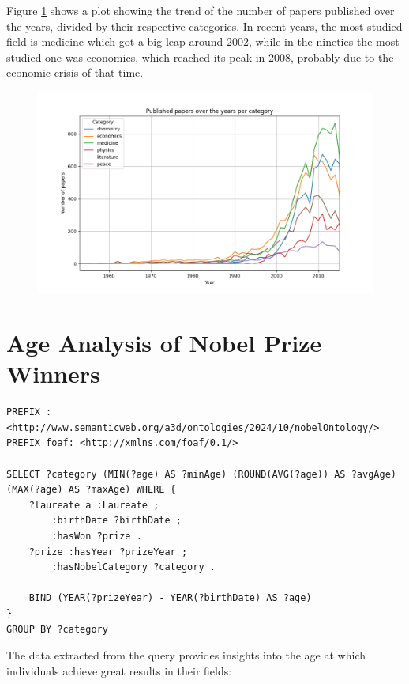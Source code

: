 \documentclass{article}
\begin{document}
\noindent Figure \ref{fig:papersPerCategory} shows a plot showing the trend of the number of papers published over the years, divided by their respective categories.
In recent years, the most studied field is medicine which got a big leap around 2002, while in the nineties the most studied one was economics, which
reached its peak in 2008, probably due to the economic crisis of that time.
\begin{figure}[ht]
	\label{fig:papersPerCategory}
	\centering
	\includegraphics[width=\textwidth]{../queries/plots/papersPerCategory.png}
\end{figure}

\newpage

\section{Age Analysis of Nobel Prize Winners} \label{winners age}
\begin{lstlisting}
PREFIX : <http://www.semanticweb.org/a3d/ontologies/2024/10/nobelOntology/>
PREFIX foaf: <http://xmlns.com/foaf/0.1/>

SELECT ?category (MIN(?age) AS ?minAge) (ROUND(AVG(?age)) AS ?avgAge) (MAX(?age) AS ?maxAge) WHERE {
    ?laureate a :Laureate ;
        :birthDate ?birthDate ;
        :hasWon ?prize .
    ?prize :hasYear ?prizeYear ;
        :hasNobelCategory ?category .

    BIND (YEAR(?prizeYear) - YEAR(?birthDate) AS ?age)
}
GROUP BY ?category
\end{lstlisting}

The data extracted from the query provides insights into the age at which individuals achieve great results in
their fields:
\end{document}
